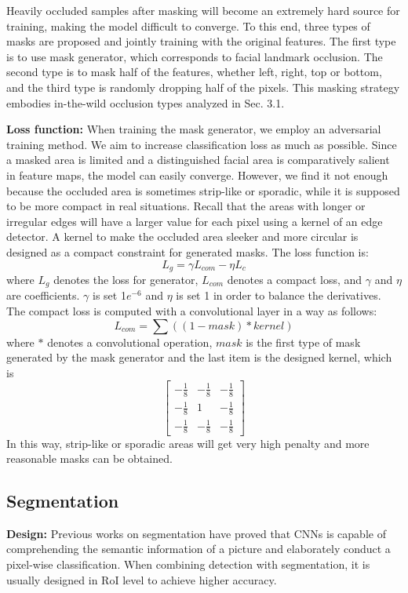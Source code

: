 \documentclass[10pt,twocolumn,letterpaper]{article}
\begin{document}
Heavily occluded samples after masking will become an extremely hard source for training, making the model difficult to converge. To this end, three types of masks are proposed and jointly training with the original features. The first type is to use mask generator, which corresponds to facial landmark occlusion. The second type is to mask half of the features, whether left, right, top or bottom, and the third type is randomly dropping half of the pixels. This masking strategy embodies in-the-wild occlusion types analyzed in Sec. 3.1.

 \textbf{Loss function: }When training the mask generator, we employ an adversarial training method. We aim to increase classification loss as much as possible. Since a masked area is limited and a distinguished facial area is comparatively salient in feature maps, the model can easily converge. However, we find it not enough because the occluded area is sometimes strip-like or sporadic, while it is supposed to be more compact in real situations. Recall that the areas with longer or irregular edges will have a larger value for each pixel using a kernel of an edge detector. A kernel to make the occluded area sleeker and more circular is designed as a compact constraint for generated masks. The loss function is:
\begin{equation}
L_g = \gamma L_{com} - \eta L_c
\end{equation}
where $L_g$ denotes the loss for generator, $L_{com}$ denotes a compact loss, and $\gamma$ and $\eta$ are coefficients. $\gamma$ is set 1$e^{-6}$ and $\eta$ is set 1 in order to balance the derivatives. The compact loss is computed with a convolutional layer in a way as follows:
\begin{equation}
L_{com} = \sum((1-mask) \ast kernel)
\end{equation}
where $\ast$ denotes a convolutional operation, $mask$ is the first type of mask generated by the mask generator and the last item is the designed kernel, which is
$$
\left[
\begin{array}{ccc}
 	-\frac{1}{8} & -\frac{1}{8} & -\frac{1}{8} \\
	-\frac{1}{8} & 1 & -\frac{1}{8} \\
	-\frac{1}{8} & -\frac{1}{8} & -\frac{1}{8}
\end{array}
\right]
$$
In this way, strip-like or sporadic areas will get very high penalty and more reasonable masks can be obtained. 



\subsection{Segmentation}
 \textbf{Design:} Previous works on segmentation have proved that CNNs is capable of comprehending the semantic information of a picture and elaborately conduct a pixel-wise classification. When combining detection with segmentation, it is usually designed in RoI level to achieve higher accuracy. 
 
\end{document}

